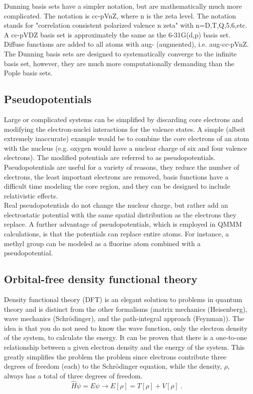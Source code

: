 \documentclass[12pt]{report}
\begin{document}
Dunning basis sets have a simpler notation, but are mathematically much more
complicated. The notation is cc-pVnZ, where n is the zeta level. The notation
stands for "correlation consistent polarized valence n zeta" with
n=D,T,Q,5,6,etc. A cc-pVDZ basis set is approximately the same as the
6-31G(d,p) basis set. Diffuse functions are added to all atoms with aug-
(augmented), i.e. aug-cc-pVnZ. The Dunning basis sets are designed to
systematically converge to the infinite basis set, however, they are much more
computationally demanding than the Pople basis sets.

\subsection{Pseudopotentials}

Large or complicated systems can be simplified by discarding core electrons
and modifying the electron-nuclei interactions for the valence states. A
simple (albeit extremely inaccurate) example would be to combine the core
electrons of an atom with the nucleus (e.g. oxygen would have a nuclear charge
of six and four valence electrons). The modified potentials are referred to as
pseudopotentials. Pseudopotentials are useful for a variety of reasons, they
reduce the number of electrons, the least important electrons are removed,
basis functions have a difficult time modeling the core region, and they can
be designed to include relativistic effects. \\

Real pseudopotentials do not change the nuclear charge, but rather add an
electrostatic potential with the same spatial distribution as the electrons
they replace. A further advantage of pseudopotentials, which is employed in
QMMM calculations, is that the potentials can replace entire atoms. For
instance, a methyl group can be modeled as a fluorine atom combined with a
pseudopotential.

\subsection{Orbital-free density functional theory}

Density functional theory (DFT) is an elegant solution to problems in quantum
theory and is distinct from the other formalisms (matrix mechanics
(Heisenberg), wave mechanics (Schr\"{o}dinger), and the path-integral approach
(Feynman)). The idea is that you do not need to know the wave function, only
the electron density of the system, to calculate the energy. It can be proven
that there is a one-to-one relationship between a given electron density and
the energy of the system. This greatly simplifies the problem the problem
since electrons contribute three degrees of freedom (each) to the
Schr\"{o}dinger equation, while the density, $\rho$, always has a total of
three degrees of freedom.
\begin{equation}
 \hat H\psi=E\psi \to E[\rho] = T[\rho]+V[\rho] \; .
\end{equation}
\end{document}
